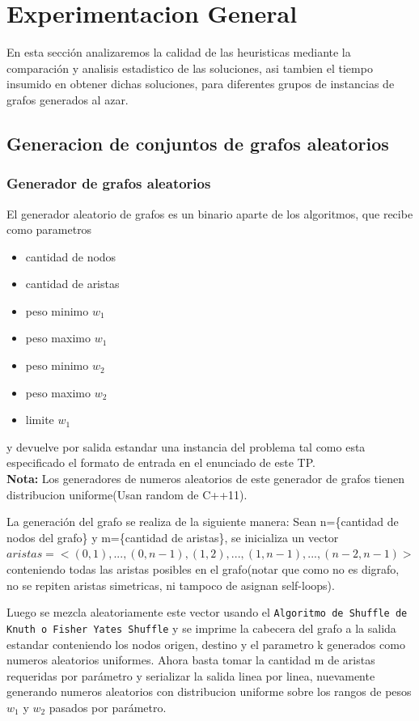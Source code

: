 \section{Experimentacion General}
En esta secci\'on analizaremos la calidad de las heuristicas mediante la comparaci\'on y analisis estadistico de las soluciones, asi tambien el tiempo insumido en obtener dichas soluciones, para diferentes grupos de instancias de grafos generados al azar.

\subsection{Generacion de conjuntos de grafos aleatorios}

\subsubsection{Generador de grafos aleatorios}
El generador aleatorio de grafos es un binario aparte de los algoritmos, que recibe como parametros
\begin{itemize}
\item cantidad de nodos
\item cantidad de aristas
\item peso minimo $w_1$
\item peso maximo $w_1$
\item peso minimo $w_2$
\item peso maximo $w_2$
\item limite $w_1$
\end{itemize}
y devuelve por salida estandar una instancia del problema tal como esta especificado el formato de entrada en el enunciado de este TP.\\
\textbf{Nota: }Los generadores de numeros aleatorios de este generador de grafos tienen distribucion uniforme(Usan random de C++11).

\vspace{1cm}

La generaci\'on del grafo se realiza de la siguiente manera: 
Sean n=\{cantidad de nodos del grafo\} y m=\{cantidad de aristas\}, se inicializa un vector $aristas =  <(0, 1), ..., (0, n-1), (1, 2), ..., (1, n-1), ..., (n - 2, n-1)>$ conteniendo todas las aristas posibles en el grafo(notar que como no es digrafo, no se repiten aristas simetricas, ni tampoco de asignan self-loops).

\vspace{1cm}

Luego se mezcla aleatoriamente este vector usando el \texttt{Algoritmo de Shuffle de Knuth o Fisher Yates Shuffle} y se imprime la cabecera del grafo a la salida estandar conteniendo los nodos origen, destino y el parametro k generados como numeros aleatorios uniformes. Ahora basta tomar la cantidad m de aristas requeridas por par\'ametro y serializar la salida linea por linea, nuevamente generando numeros aleatorios con distribucion uniforme sobre los rangos de pesos $w_1$ y $w_2$ pasados por par\'ametro.

